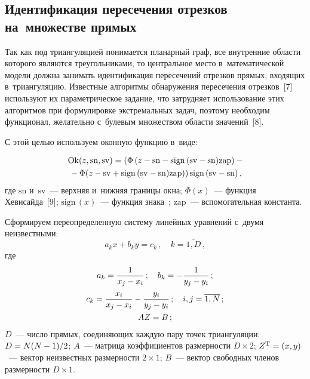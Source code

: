\begin{multicols}{2}
  \vspace*{-6pt}
  
  
\section{Идентификация пересечения отрезков на~множестве 
прямых}

  Так как под триангуляцией понимается пла\-нарный граф, все внут\-рен\-ние 
области которого являются треугольниками, то центральное мес\-то 
в~математиче\-ской модели долж\-на занимать идентификация пересечений 
отрезков прямых, входящих в~триангуляцию. Известные алгоритмы 
обнаружения пересечения отрезков~[7] используют их па\-ра\-мет\-ри\-че\-ское 
задание, что затрудняет использование этих алгоритмов при формулировке 
экстремальных задач, поэтому необходим функционал, желательно с~булевым 
множеством об\-ласти значений~[8].
  
  С этой целью используем оконную функцию в~виде:
  
\noindent
  \begin{multline*}
  \mathrm{Ok} (z, \mathrm{sn}, \mathrm{sv}) =
  \left( \Phi\left(z-\mathrm{sn}-\mathrm{sign}\,(\mathrm{sv}-
  \mathrm{sn}) \mathrm{zap}\right) - {}\right.\hspace*{-4.52142pt}\\
\left.  {}-
\Phi(z-\mathrm{sv}+\mathrm{sign}\,(\mathrm{sv}-
\mathrm{sn}) \mathrm{zap})\right) \mathrm{sign}\,(\mathrm{sv}-\mathrm{sn})\,,
  \end{multline*}
где $\mathrm{sn}$ и~$\mathrm{sv}$~--- верх\-няя и~ниж\-няя границы окна; $\Phi(x)$~--- функция 
Хевисайда~[9]; $\mathrm{sign}\,(x)$~--- функция знака~\cite{10-man}; $\mathrm{zap}$~--- 
вспомогательная константа.
  
  Сформируем переопределенную сис\-те\-му линейных урав\-не\-ний с~двумя 
неизвестными:
  \begin{equation}
    a_k x +b_k y=c_k\,,\quad
k=\overline{1,D}\,,
  \label{e2-man}
\end{equation}
где
\begin{gather*}
  a_k=\displaystyle\frac{\displaystyle 1\mathstrut}{\displaystyle x_j-x_i\mathstrut}\,;\quad b_k=-\displaystyle\frac{\displaystyle 1\mathstrut}{\displaystyle y_j-y_i\mathstrut}\,;\\
   c_k=\displaystyle\frac{\displaystyle x_i\mathstrut}{\displaystyle x_j-x_i\mathstrut}-  \displaystyle\frac{\displaystyle y_i\mathstrut}{\displaystyle y_j-y_i\mathstrut}\,;\quad i,j=\overline{1,N}\,;\\
  A Z =B\,;
    \end{gather*}
$D$~--- чис\-ло прямых, соединяющих каждую пару точек триангуляции:
$D\hm={N(N\hm-1)}/{2}$;
$A$~--- матрица коэффициентов размерности $D\times 2$;
$Z^{\mathrm{T}}\hm=(x,y)$~--- вектор неизвестных раз\-мер\-ности $2\times 1$;
$B$~--- вектор свободных членов раз\-мер\-ности $D\times 1$.


\end{multicols}
